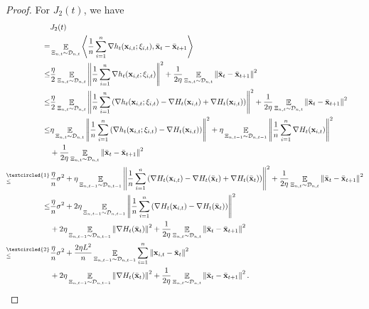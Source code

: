\documentclass{article}
\begin{document}
\begin{proof}
For $J_2(t)$, we have
\begin{align}
\nonumber
& J_2(t) \\ \nonumber 
= & \EE_{ \Xi_{n,t} \sim \Dcal_{n,t} }\lrangle{\frac{1}{n}\sum_{i=1}^n\nabla h_t(\x_{i,t};\xi_{i,t}), \bar{\x}_t - \bar{\x}_{t+1} } \\ \nonumber
\le & \frac{\eta}{2}\EE_{ \Xi_{n,t} \sim \Dcal_{n,t} } \lrnorm{\frac{1}{n}\sum_{i=1}^n \nabla h_t(\x_{i,t};\xi_{i,t})}^2 + \frac{1}{2\eta} \EE_{ \Xi_{n,t} \sim \Dcal_{n,t} }\lrnorm{ \bar{\x}_t - \bar{\x}_{t+1}}^2  \\ \nonumber
\le & \frac{\eta}{2}\EE_{ \Xi_{n,t} \sim \Dcal_{n,t} }\lrnorm{\frac{1}{n}\sum_{i=1}^n \lrincir{\nabla  h_t(\x_{i,t};\xi_{i,t}) - \nabla H_t(\x_{i,t}) + \nabla H_t(\x_{i,t})} }^2 + \frac{1}{2\eta} \EE_{ \Xi_{n,t} \sim \Dcal_{n,t} }\lrnorm{ \bar{\x}_t - \bar{\x}_{t+1}}^2  \\ \nonumber
\le &  \eta\EE_{ \Xi_{n,t} \sim \Dcal_{n,t} }\lrnorm{\frac{1}{n}\sum_{i=1}^n \lrincir{ \nabla h_t(\x_{i,t};\xi_{i,t}) - \nabla H_t(\x_{i,t}) } }^2 + \eta \EE_{ \Xi_{n,t-1} \sim \Dcal_{n,t-1} }\lrnorm{\frac{1}{n}\sum_{i=1}^n\nabla H_t(\x_{i,t})}^2 \\ \nonumber 
& + \frac{1}{2\eta} \EE_{ \Xi_{n,t} \sim \Dcal_{n,t} }\lrnorm{ \bar{\x}_t - \bar{\x}_{t+1}}^2  \\ \nonumber
\refabovecir{\le}{\textcircled{1}} & \frac{\eta}{n} \sigma^2 + \eta \EE_{ \Xi_{n,t-1} \sim \Dcal_{n,t-1} }\lrnorm{ \frac{1}{n}\sum_{i=1}^n \lrincir{ \nabla H_t(\x_{i,t}) - \nabla H_t(\bar{\x}_t) + \nabla H_t(\bar{\x}_t) } }^2 + \frac{1}{2\eta} \EE_{ \Xi_{n,t} \sim \Dcal_{n,t} }\lrnorm{ \bar{\x}_t - \bar{\x}_{t+1}}^2 \\ \nonumber
\le & \frac{\eta}{n} \sigma^2 + 2\eta \EE_{ \Xi_{n,t-1} \sim \Dcal_{n,t-1} }\lrnorm{\frac{1}{n}\sum_{i=1}^n \lrincir{ \nabla H_t(\x_{i,t}) - \nabla H_t(\bar{\x}_t) } }^2 \\ \nonumber 
& + 2\eta \EE_{ \Xi_{n,t-1} \sim \Dcal_{n,t-1} }\lrnorm{\nabla H_t(\bar{\x}_t)}^2 + \frac{1}{2\eta} \EE_{ \Xi_{n,t} \sim \Dcal_{n,t} }\lrnorm{ \bar{\x}_t - \bar{\x}_{t+1}}^2 \\ \nonumber
\refabovecir{\le}{\textcircled{2}} & \frac{\eta}{n} \sigma^2 + \frac{2\eta L^2}{n}\EE_{ \Xi_{n,t-1} \sim \Dcal_{n,t-1} }\sum_{i=1}^n \lrnorm{\x_{i,t} - \bar{\x}_t }^2 \\ \label{equa_j2_temp} 
& + 2\eta \EE_{ \Xi_{n,t-1} \sim \Dcal_{n,t-1} }\lrnorm{\nabla H_t(\bar{\x}_t)}^2 + \frac{1}{2\eta} \EE_{ \Xi_{n,t} \sim \Dcal_{n,t} }\lrnorm{ \bar{\x}_t - \bar{\x}_{t+1}}^2.

\end{align}
\end{proof}
\end{document}
